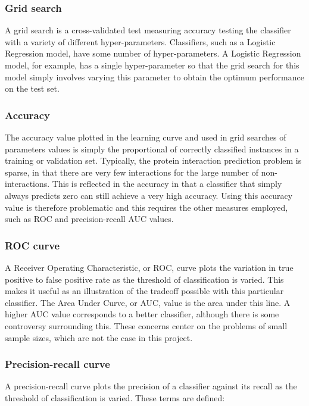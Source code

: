 

\subsubsection{Grid search}
A grid search is a cross-validated test measuring accuracy testing the classifier with a variety of different hyper-parameters.
Classifiers, such as a Logistic Regression model, have some number of hyper-parameters.
A Logistic Regression model, for example, has a single hyper-parameter so that the grid search for this model simply involves varying this parameter to obtain the optimum performance on the test set.

\subsubsection{Accuracy}
The accuracy value plotted in the learning curve and used in grid searches of parameters values is simply the proportional of correctly classified instances in a training or validation set.
Typically, the protein interaction prediction problem is sparse, in that there are very few interactions for the large number of non-interactions.
This is reflected in the accuracy in that a classifier that simply always predicts zero can still achieve a very high accuracy.
Using this accuracy value is therefore problematic and this requires the other measures employed, such as ROC and precision-recall AUC values.

\subsubsection{ROC curve}
A Receiver Operating Characteristic, or ROC, curve plots the variation in true positive to false positive rate as the threshold of classification is varied.
This makes it useful as an illustration of the tradeoff possible with this particular classifier.
The Area Under Curve, or AUC, value is the area under this line.
A higher AUC value corresponds to a better classifier, although there is some controversy surrounding this\autocite{hanczar_small-sample_2010}.
These concerns center on the problems of small sample sizes, which are not the case in this project.

\subsubsection{Precision-recall curve}
A precision-recall curve plots the precision of a classifier against its recall as the threshold of classification is varied.
These terms are defined:

